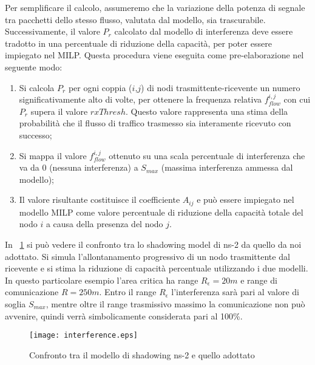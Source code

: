 Per semplificare il calcolo, assumeremo che la variazione della potenza di segnale tra pacchetti dello stesso flusso, valutata dal modello, sia trascurabile. \\
Successivamente, il valore $P_r$ calcolato dal modello di interferenza deve essere tradotto in una percentuale di riduzione della capacità, per poter essere impiegato nel MILP. Questa procedura viene eseguita come pre-elaborazione nel seguente modo:
\begin{enumerate}  
	\item Si calcola $P_r$ per ogni coppia ($i$,$j$) di nodi trasmittente-ricevente un numero significativamente alto di volte, per ottenere la frequenza relativa $f_{flow}^{i,j}$ con cui $P_r$ supera il valore $rxThresh$. Questo valore rappresenta una stima della probabilità che il flusso di traffico trasmesso sia interamente ricevuto con successo;
	\item Si mappa il valore $f_{flow}^{i,j}$ ottenuto su una scala percentuale di interferenza che va da $0$ (nessuna interferenza) a $S_{max}$ (massima interferenza ammessa dal modello);
	\item Il valore risultante costituisce il coefficiente $A_{ij}$ e può essere impiegato nel modello MILP come valore percentuale di riduzione della capacità totale del nodo $i$ a causa della presenza del nodo $j$.
\end{enumerate}
%
In \figurename\ \ref{fig:interference} si può vedere il confronto tra lo shadowing model di ns-2 da quello da noi adottato. Si simula l'allontanamento progressivo di un nodo trasmittente dal ricevente e si stima la riduzione di capacità percentuale utilizzando i due modelli. \\
In questo particolare esempio l'area critica ha range $R_\epsilon = 20 m$ e range di comunicazione $R = 250 m$. Entro il range $R_\epsilon$ l'interferenza sarà pari al valore di soglia $S_{max}$, mentre oltre il range trasmissivo massimo la comunicazione non può avvenire, quindi verrà simbolicamente considerata pari al 100\%.
%
\begin{figure}
	\begin{center}
		\texttt{[image: interference.eps]}
	\end{center}
	\caption{Confronto tra il modello di shadowing ns-2 e quello adottato} \label{fig:interference}
\end{figure}
%






